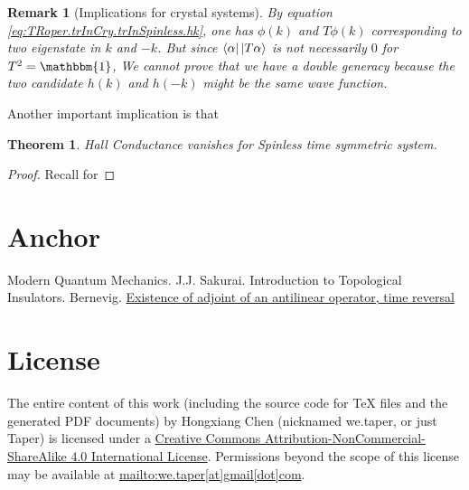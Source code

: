 \documentclass{article}
\numberwithin{equation}{subsection} %
\newtheorem{thm}{Theorem}[section]
\newtheorem{remark}{Remark}[section]
\theoremstyle{definition}
\begin{document}
        \begin{remark}[Implications for crystal systems]
            By equation \ref{eq:TRoper.trInCry.trInSpinless.hk}, one has
            $\phi(k)$ and $T\phi(k)$ corresponding to two eigenstate in
            $k$ and $-k$. But since $\bra{\alpha}\ket{T\alpha}$ is not
            necessarily $0$ for $T^2= \mathbbm{1}$, We cannot prove
            that we have a double generacy because the two candidate
            $h(k)$ and $h(-k)$ might be the same wave function.
        \end{remark}

        Another important implication is that
        \begin{thm}
            Hall Conductance vanishes for Spinless time
            symmetric system.  
        \end{thm}
        \begin{proof}
            Recall for 
        \end{proof}
        
        
\section{Anchor}
\label{sec:Anchor}
\begin{thebibliography}{1}
     Modern Quantum Mechanics. J.J. Sakurai.
     Introduction to Topological Insulators. Bernevig.
    \href{http://physics.stackexchange.com/questions/45227/existence-of-adjoint-of-an-antilinear-operator-time-reversal}{Existence of adjoint of an antilinear operator, time reversal}
\end{thebibliography}
\printnomenclature
\section{License}
The entire content of this work (including the source code
for TeX files and the generated PDF documents) by 
Hongxiang Chen (nicknamed we.taper, or just Taper) is
licensed under a 
\href{http://creativecommons.org/licenses/by-nc-sa/4.0/}{Creative 
Commons Attribution-NonCommercial-ShareAlike 4.0 International 
License}. Permissions beyond the scope of this 
license may be available at \url{mailto:we.taper[at]gmail[dot]com}.
\end{document}
